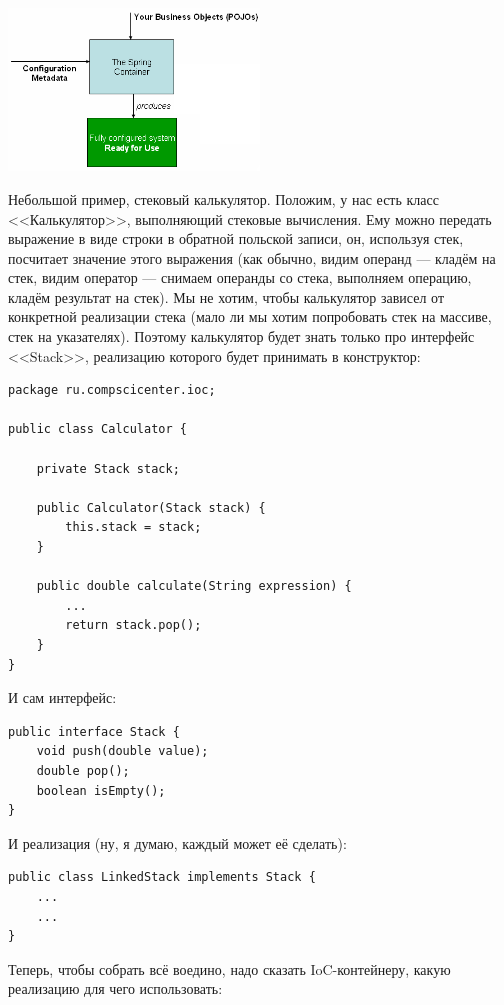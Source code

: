 \documentclass{../../text-style}
\begin{document}
\begin{center}
    \includegraphics[width=0.5\textwidth]{springIoC.png}
\end{center}

Небольшой пример, стековый калькулятор. Положим, у нас есть класс <<Калькулятор>>, выполняющий стековые вычисления. Ему можно передать выражение в виде строки в обратной польской записи, он, используя стек, посчитает значение этого выражения (как обычно, видим операнд --- кладём на стек, видим оператор --- снимаем операнды со стека, выполняем операцию, кладём результат на стек). Мы не хотим, чтобы калькулятор зависел от конкретной реализации стека (мало ли мы хотим попробовать стек на массиве, стек на указателях). Поэтому калькулятор будет знать только про интерфейс <<Stack>>, реализацию которого будет принимать в конструктор:

\begin{verbatim}
package ru.compscicenter.ioc;

public class Calculator {

    private Stack stack;

    public Calculator(Stack stack) {
        this.stack = stack;
    }

    public double calculate(String expression) {
        ...
        return stack.pop();
    }
}
\end{verbatim}

И сам интерфейс:

\begin{verbatim}
public interface Stack {
    void push(double value);
    double pop();
    boolean isEmpty();
}
\end{verbatim}

И реализация (ну, я думаю, каждый может её сделать):

\begin{verbatim}
public class LinkedStack implements Stack {
    ...
    ...
}
\end{verbatim}

Теперь, чтобы собрать всё воедино, надо сказать IoC-контейнеру, какую реализацию для чего использовать:
\end{document}
